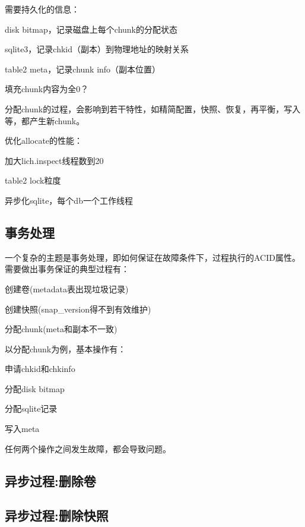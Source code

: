 需要持久化的信息：
\begin{compactitem}
\item disk bitmap，记录磁盘上每个chunk的分配状态
\item sqlite3，记录chkid（副本）到物理地址的映射关系
\item table2 meta，记录chunk info（副本位置）
\item 填充chunk内容为全0？
\end{compactitem}

分配chunk的过程，会影响到若干特性，如精简配置，快照、恢复，再平衡，写入等，都产生新chunk。

优化allocate的性能：
\begin{compactitem}
\item 加大lich.inspect线程数到20
\item table2 lock粒度 
\item 异步化sqlite，每个db一个工作线程
\end{compactitem}

\subsection{事务处理}

一个复杂的主题是事务处理，即如何保证在故障条件下，过程执行的ACID属性。
需要做出事务保证的典型过程有：
\begin{compactenum}
\item 创建卷(metadata表出现垃圾记录)
\item 创建快照(snap\_version得不到有效维护)
\item 分配chunk(meta和副本不一致)
\end{compactenum}

以分配chunk为例，基本操作有：
\begin{compactenum}
\item 申请chkid和chkinfo
\item 分配disk bitmap
\item 分配sqlite记录
\item 写入meta
\end{compactenum}

任何两个操作之间发生故障，都会导致问题。

\subsection{异步过程:删除卷}

\subsection{异步过程:删除快照}

